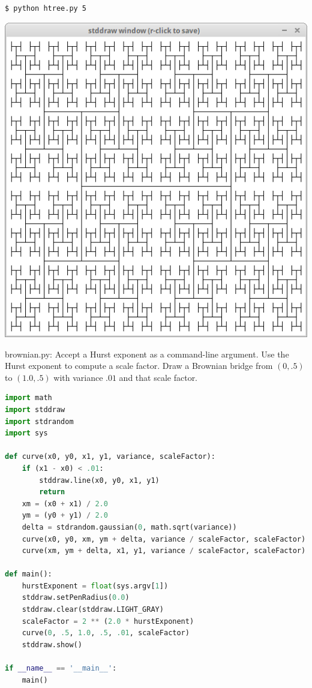 \documentclass[8pt,a4paper,compress,handout]{beamer}
\begin{document}
\begin{frame}[fragile]
\begin{minipage}{160pt}
\begin{lstlisting}[language={}]
$ python htree.py 5
\end{lstlisting}
\end{minipage}%
\begin{minipage}{140pt}
\hfill \includegraphics[scale=0.15]{figures/htree3.png}
\end{minipage}
\end{frame}

\begin{frame}[fragile]
\begin{framed}
\tiny brownian.py: Accept a Hurst exponent as a command-line argument. Use the Hurst exponent to compute a scale factor. Draw a Brownian bridge from $(0, .5)$ to $(1.0, .5)$ with variance $.01$ and that scale factor.
\end{framed}

\begin{lstlisting}[language=Python]
import math
import stddraw
import stdrandom
import sys

def curve(x0, y0, x1, y1, variance, scaleFactor):
    if (x1 - x0) < .01:
        stddraw.line(x0, y0, x1, y1)
        return
    xm = (x0 + x1) / 2.0
    ym = (y0 + y1) / 2.0
    delta = stdrandom.gaussian(0, math.sqrt(variance))
    curve(x0, y0, xm, ym + delta, variance / scaleFactor, scaleFactor)
    curve(xm, ym + delta, x1, y1, variance / scaleFactor, scaleFactor)

def main():
    hurstExponent = float(sys.argv[1])
    stddraw.setPenRadius(0.0)
    stddraw.clear(stddraw.LIGHT_GRAY)
    scaleFactor = 2 ** (2.0 * hurstExponent)
    curve(0, .5, 1.0, .5, .01, scaleFactor)
    stddraw.show()

if __name__ == '__main__':
    main()
\end{lstlisting}
\end{frame}
\end{document}
